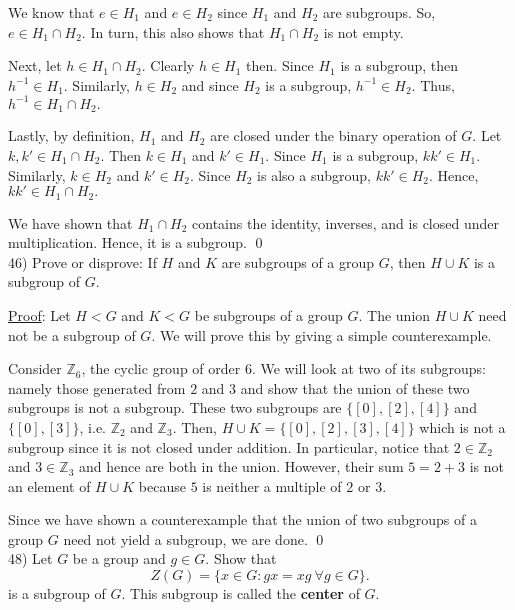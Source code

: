 \documentclass{article}
\begin{document}
We know that $e \in H_1$ and $e \in H_2$ since $H_1$ and $H_2$ are subgroups. So, $e \in H_1 \cap H_2. $ In turn, this also shows that $H_1 \cap H_2$ is not empty.

Next, let $h \in H_1 \cap H_2$. Clearly $h \in H_1$ then. Since $H_1$ is a subgroup, then $h^{-1} \in H_1$. Similarly, $h \in H_2$ and since $H_2$ is a subgroup, $h^{-1} \in H_2.$ Thus, $h^{-1} \in H_1 \cap H_2. $

Lastly, by definition, $H_1$ and $H_2$ are closed under the binary operation of $G$. Let $k, k' \in H_1 \cap H_2.$ Then $k \in H_1$ and $k' \in H_1$. Since $H_1$ is a subgroup, $kk' \in H_1$. Similarly, $k \in H_2$ and $k' \in H_2.$ Since $H_2$ is also a subgroup, $kk' \in H_2$. Hence, $kk' \in H_1 \cap H_2.$

We have shown that $H_1 \cap H_2$ contains the identity, inverses, and is closed under multiplication. Hence, it is a subgroup. \qed \\

46) Prove or disprove: If $H$ and $K$ are subgroups of a group $G$, then $H \cup K$ is a subgroup of $G.$

\underline{Proof}: Let $H < G$ and $K < G$ be subgroups of a group $G.$ The union $H \cup K$ need not be a subgroup of $G$. We will prove this by giving a simple counterexample. 

Consider $\mathbb{Z}_6$, the cyclic  group of order $6$. We will look at two of its subgroups: namely those generated from $2$ and $3$ and show that the union of these two subgroups is not a subgroup. These two subgroups are $\{[0], [2], [4]\}$ and $\{[0], [3]\}$, i.e. $\mathbb{Z}_2$ and $\mathbb{Z}_3$.  Then, $H \cup K = \{[0], [2], [3], [4]\}$ which is not a subgroup since it is not closed under addition. In particular, notice that $2 \in \mathbb{Z}_2$ and $3 \in \mathbb{Z}_3$ and hence are both in the union. However, their sum $5 = 2 + 3$ is not an element of $H \cup K$ because $5$ is neither a multiple of $2$ or $3$.

Since we have shown a counterexample that the union of two subgroups of a group $G$ need not yield a subgroup, we are done. \qed \\


48) Let $G$ be a group and $g \in G.$ Show that 
	$$ Z(G) = \{x \in G : gx = xg \ \forall g \in G\}. $$
is a subgroup of $G$. This subgroup is called the \textbf{center} of $G$.
\end{document}

